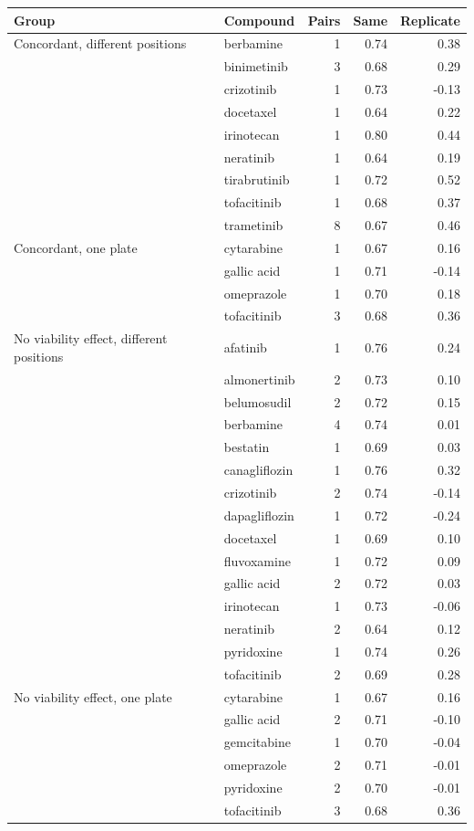 \begin{table}[!htbp]
{\begin{minipage}{183mm}
\vspace{3mm}
\begin{tabular}{@{}llrrr@{}}\toprule
Group & Compound & Pairs & Same & Replicate \\
\midrule
Concordant, different positions & berbamine & 1 & 0.74 & 0.38 \\
 & binimetinib & 3 & 0.68 & 0.29 \\
 & crizotinib & 1 & 0.73 & -0.13 \\
 & docetaxel & 1 & 0.64 & 0.22 \\
 & irinotecan & 1 & 0.80 & 0.44 \\
 & neratinib & 1 & 0.64 & 0.19 \\
 & tirabrutinib & 1 & 0.72 & 0.52 \\
 & tofacitinib & 1 & 0.68 & 0.37 \\
 & trametinib & 8 & 0.67 & 0.46 \\
\addlinespace[2pt]
Concordant, one plate & cytarabine & 1 & 0.67 & 0.16 \\
 & gallic acid & 1 & 0.71 & -0.14 \\
 & omeprazole & 1 & 0.70 & 0.18 \\
 & tofacitinib & 3 & 0.68 & 0.36 \\
\addlinespace[2pt]
No viability effect, different positions & afatinib & 1 & 0.76 & 0.24 \\
 & almonertinib & 2 & 0.73 & 0.10 \\
 & belumosudil & 2 & 0.72 & 0.15 \\
 & berbamine & 4 & 0.74 & 0.01 \\
 & bestatin & 1 & 0.69 & 0.03 \\
 & canagliflozin & 1 & 0.76 & 0.32 \\
 & crizotinib & 2 & 0.74 & -0.14 \\
 & dapagliflozin & 1 & 0.72 & -0.24 \\
 & docetaxel & 1 & 0.69 & 0.10 \\
 & fluvoxamine & 1 & 0.72 & 0.09 \\
 & gallic acid & 2 & 0.72 & 0.03 \\
 & irinotecan & 1 & 0.73 & -0.06 \\
 & neratinib & 2 & 0.64 & 0.12 \\
 & pyridoxine & 1 & 0.74 & 0.26 \\
 & tofacitinib & 2 & 0.69 & 0.28 \\
\addlinespace[2pt]
No viability effect, one plate & cytarabine & 1 & 0.67 & 0.16 \\
 & gallic acid & 2 & 0.71 & -0.10 \\
 & gemcitabine & 1 & 0.70 & -0.04 \\
 & omeprazole & 2 & 0.71 & -0.01 \\
 & pyridoxine & 2 & 0.70 & -0.01 \\
 & tofacitinib & 3 & 0.68 & 0.36 \\
\bottomrule\end{tabular}
\end{minipage}}
\makebox[\textwidth][c]{\usebox{\tbox}}
\end{table}

